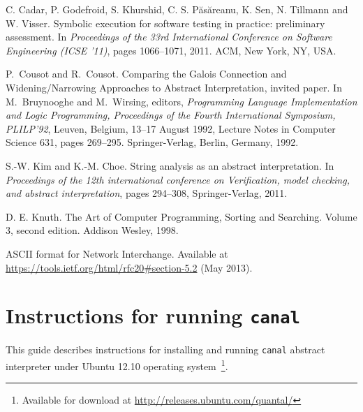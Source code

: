 \documentclass[12pt,final,oneside]{fithesis2}
\theoremstyle{definition}
\begin{document}
\begin{thebibliography}{99}
C. Cadar, P. Godefroid, S. Khurshid, C. S. P\u{a}s\u{a}reanu, K. Sen, N. Tillmann and W. Visser.
\newblock Symbolic execution for software testing in practice: preliminary
  assessment.
\newblock In \emph{Proceedings of the 33rd International Conference on
  Software Engineering (ICSE '11)}, pages 1066--1071, 2011. ACM, New York,
  NY, USA.

P.~Cousot and R.~Cousot.
\newblock Comparing the {G}alois Connection and Widening/Narrowing
  Approaches to Abstract Interpretation, invited paper.
\newblock In M.~Bruynooghe and M.~Wirsing, editors, \emph{Programming
  Language Implementation and Logic Programming, Proceedings of the
  Fourth International Symposium, PLILP'92}, Leuven, Belgium, 13--17
  August 1992, Lecture Notes in Computer Science 631, pages 269--295.
  Springer-Verlag, Berlin, Germany, 1992.

S.-W. Kim and K.-M. Choe.
\newblock String analysis as an abstract interpretation.
\newblock In \emph{Proceedings of the 12th international conference on
  Verification, model checking, and abstract interpretation}, pages 294--308,
  Springer-Verlag, 2011.

D. E. Knuth.
\newblock The Art of Computer Programming, Sorting and Searching.
\newblock Volume 3, second edition. Addison Wesley, 1998.

\newblock ASCII format for Network Interchange.
\newblock Available at \url{https://tools.ietf.org/html/rfc20#section-5.2}
  (May 2013).

\end{thebibliography}


\appendix

\chapter{Instructions for running \texttt{canal}}
\label{chap:instructions}

This guide describes instructions for installing and running \texttt{canal}
abstract interpreter under Ubuntu 12.10 operating
system~\footnote{Available for download at
\url{http://releases.ubuntu.com/quantal/}}.
\end{document}
